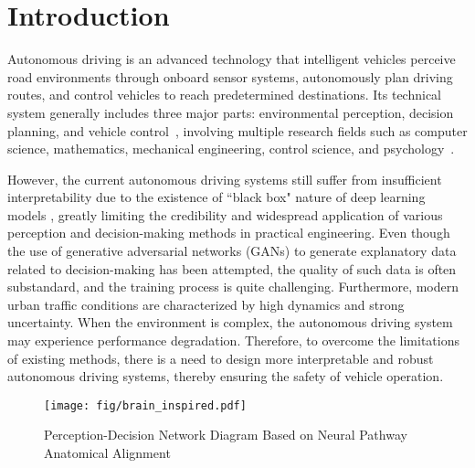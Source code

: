 \section{Introduction}
\label{sec:intro}
\hspace{1pc}Autonomous driving \cite{urmson2008autonomous} is an advanced technology that intelligent vehicles perceive road environments through onboard sensor systems, autonomously plan driving routes, and control vehicles to reach predetermined destinations. 
Its technical system generally includes three major parts: environmental perception, decision planning, and vehicle control~\cite{amini2020learning, montemerlo2008junior}, involving multiple research fields such as computer science, mathematics, mechanical engineering, control science, and psychology~\cite{chen2015deepdriving}.


However, the current autonomous driving systems still suffer from insufficient interpretability due to the existence of ``black box" nature of deep learning models \cite{7979332}, greatly limiting the credibility and widespread application of various perception and decision-making methods in practical engineering. 
Even though the use of generative adversarial networks (GANs) \cite{zugner2020adversarial} to generate explanatory data related to decision-making has been attempted, the quality of such data is often substandard, and the training process is quite challenging. 
Furthermore, modern urban traffic conditions are characterized by high dynamics and strong uncertainty. 
When the environment is complex, the autonomous driving system may experience performance degradation. 
Therefore, to overcome the limitations of existing methods, there is a need to design more interpretable and robust autonomous driving systems, thereby ensuring the safety of vehicle operation.
\begin{figure}[t]
	\centering
	\texttt{[image: fig/brain\_inspired.pdf]}
	\caption{Perception-Decision Network Diagram Based on Neural Pathway Anatomical Alignment}
	\label{fig:fig1}
\end{figure}

